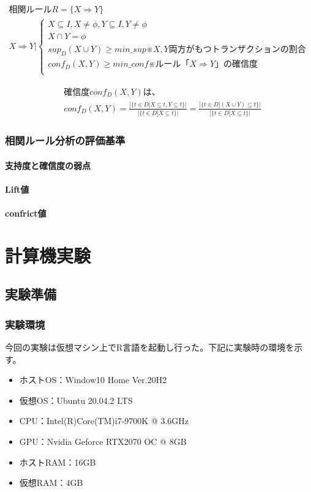 \documentclass[dvipdfmx]{jsarticle}
\begin{document}
\begin{gather*}
  相関ルールR = \{ X \Rightarrow Y \} \\
  X \Rightarrow Y |
  \begin{cases}
    {X \subseteq I, X \neq \phi , Y \subseteq I, Y \neq \phi} \\
    {X \cap Y = \phi} \\
    {sup_{D}(X\cup Y) \geq min\_sup}　※X,Y両方がもつトランザクションの割合\\
    {conf_{D}(X, Y) \geq min\_conf}　※ルール「X \Rightarrow Y」の確信度\\
  \end{cases}
\end{gather*}
\begin{fleqn}
  \begin{align*}
    &確信度conf_{D}(X, Y)は、\\
    &conf_{D}(X, Y) = \frac{|\{t\in D |X \subseteq t, Y \subseteq t\}|}{|\{ t\in D | X \subseteq t\}|}
    = \frac{|\{ t \in D | (X\cup Y) \subseteq t\}|}{|\{ t \in D | X \subseteq t\}|}
  \end{align*}
\end{fleqn}
\subsubsection{相関ルール分析の評価基準}
\paragraph{支持度と確信度の弱点}
\paragraph{Lift値}
\paragraph{confrict値}



\section{計算機実験}
\subsection{実験準備}
  \subsubsection{実験環境}
  今回の実験は仮想マシン上でR言語を起動し行った。下記に実験時の環境を示す。
  \begin{itemize}
    \item ホストOS：Window10 Home Ver.20H2
    \item 仮想OS：Ubuntu 20.04.2 LTS
    \item CPU：Intel(R)Core(TM)i7-9700K @ 3.6GHz
    \item GPU：Nvidia Geforce RTX2070 OC @ 8GB
    \item ホストRAM：16GB
    \item 仮想RAM：4GB
  \end{itemize}
\end{document}
